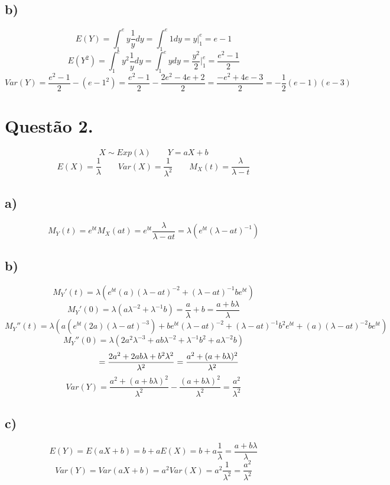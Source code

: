 \documentclass[12pt]{article}
\begin{document}
\subsection{b)}

\[E(Y) = \int_{1}^{e} y \dfrac{1}{y} dy = \int_{1}^{e} 1 dy = y \biggr|^{e}_{1} = e-1\]
\[E(Y^{2}) = \int_{1}^{e} y^{2} \dfrac{1}{y} dy = \int_{1}^{e} y dy = \dfrac{y^{2}}{2} \biggr|^{e}_{1} = \dfrac{e^{2}-1}{2}\]
\[Var(Y) = \dfrac{e^{2}-1}{2} - (e-1^{2}) = \dfrac{e^{2}-1}{2} - \dfrac{2e^{2}-4e+2}{2} = \dfrac{-e^{2}+4e-3}{2} = -\dfrac{1}{2}(e-1)(e-3)\]

\section{Questão 2.}

\[X \sim Exp(\lambda) \qquad Y = aX+b\]
\[E(X) = \dfrac{1}{\lambda} \qquad Var(X) = \dfrac{1}{\lambda^{2}} \qquad M_{X}(t) = \dfrac{\lambda}{\lambda-t}\]

\subsection{a)}

\[M_{Y}(t) = e^{bt}M_{X}(at) = e^{bt}\dfrac{\lambda}{\lambda-at} = \lambda (e^{bt} (\lambda-at)^{-1})\]

\subsection{b)}

\[M_{Y}'(t) = \lambda (e^{bt}(a)(\lambda-at)^{-2} + (\lambda-at)^{-1}be^{bt})\]
\[M_{Y}'(0) = \lambda (a\lambda^{-2} + \lambda^{-1}b) = \dfrac{a}{\lambda}+b = \dfrac{a+b\lambda}{\lambda}\]
\[M_{Y}''(t) = \lambda (a(e^{bt}(2a)(\lambda-at)^{-3}) + be^{bt}(\lambda-at)^{-2} + (\lambda-at)^{-1}b^{2}e^{bt} + (a)(\lambda-at)^{-2}be^{bt})\]
\[M_{Y}''(0) = \lambda(2a^{2}\lambda^{-3} + ab\lambda^{-2} + \lambda^{-1}b^{2} + a\lambda^{-2}b)\]
\[\hspace{+37pt} = \dfrac{2a^{2} + 2ab\lambda + b^{2}\lambda^{2}}{\lambda^{2}} = \dfrac{a^{2} + (a+b\lambda)^{2}}{\lambda^{2}}\]
\[Var(Y) = \dfrac{a^{2} + (a+b\lambda)^{2}}{\lambda^{2}} - \dfrac{(a+b\lambda)^{2}}{\lambda^{2}} = \dfrac{a^{2}}{\lambda^{2}}\]

\subsection{c)}

\[E(Y) = E(aX+b) = b+aE(X) = b+a\dfrac{1}{\lambda} = \dfrac{a+b\lambda}{\lambda}\]
\[Var(Y) = Var(aX+b) = a^{2}Var(X) = a^{2}\dfrac{1}{\lambda^{2}} = \dfrac{a^{2}}{\lambda^{2}}\]
\end{document}
